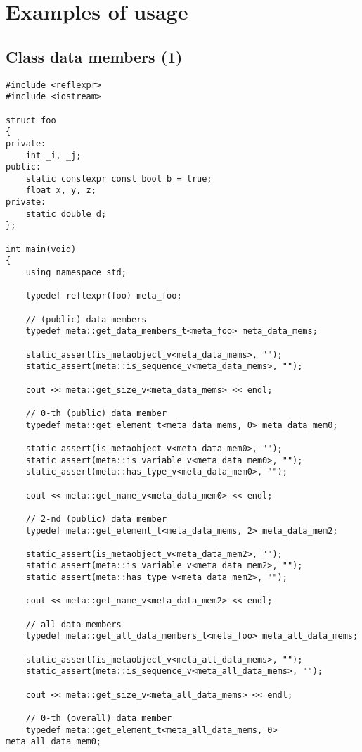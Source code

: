 \section{Examples of usage}

\subsection{Class data members (1)}

\begin{verbatim}
#include <reflexpr>
#include <iostream>

struct foo
{
private:
	int _i, _j;
public:
	static constexpr const bool b = true;
	float x, y, z;
private:
	static double d;
};

int main(void)
{
	using namespace std;

	typedef reflexpr(foo) meta_foo;

	// (public) data members
	typedef meta::get_data_members_t<meta_foo> meta_data_mems;

	static_assert(is_metaobject_v<meta_data_mems>, "");
	static_assert(meta::is_sequence_v<meta_data_mems>, "");

	cout << meta::get_size_v<meta_data_mems> << endl;

	// 0-th (public) data member
	typedef meta::get_element_t<meta_data_mems, 0> meta_data_mem0;

	static_assert(is_metaobject_v<meta_data_mem0>, "");
	static_assert(meta::is_variable_v<meta_data_mem0>, "");
	static_assert(meta::has_type_v<meta_data_mem0>, "");

	cout << meta::get_name_v<meta_data_mem0> << endl;

	// 2-nd (public) data member
	typedef meta::get_element_t<meta_data_mems, 2> meta_data_mem2;

	static_assert(is_metaobject_v<meta_data_mem2>, "");
	static_assert(meta::is_variable_v<meta_data_mem2>, "");
	static_assert(meta::has_type_v<meta_data_mem2>, "");

	cout << meta::get_name_v<meta_data_mem2> << endl;

	// all data members
	typedef meta::get_all_data_members_t<meta_foo> meta_all_data_mems;

	static_assert(is_metaobject_v<meta_all_data_mems>, "");
	static_assert(meta::is_sequence_v<meta_all_data_mems>, "");

	cout << meta::get_size_v<meta_all_data_mems> << endl;

	// 0-th (overall) data member
	typedef meta::get_element_t<meta_all_data_mems, 0> meta_all_data_mem0;


\end{verbatim}
